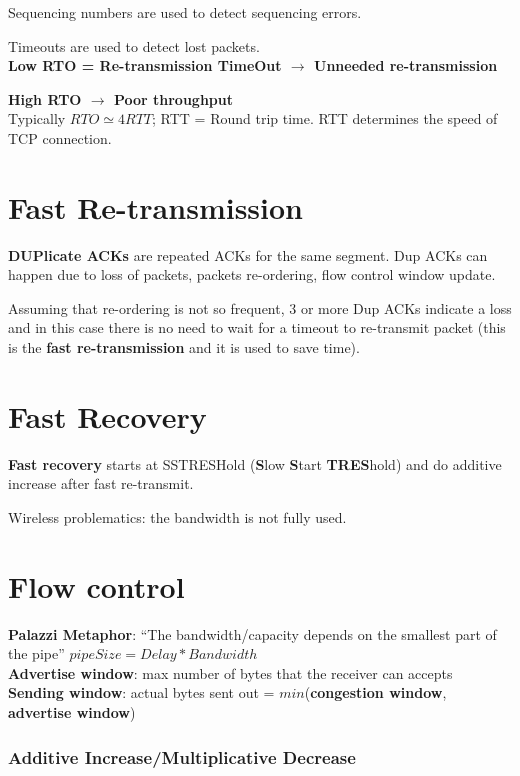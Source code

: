 Sequencing numbers are used to detect sequencing errors.

Timeouts are used to detect lost packets. \\

\textbf{Low RTO = Re-transmission TimeOut $\rightarrow$ Unneeded re-transmission}

\textbf{High RTO $\rightarrow$ Poor throughput} \\

Typically $RTO \simeq 4 RTT$; RTT = Round trip time. RTT determines the speed
of TCP connection.

\section{Fast Re-transmission}

\textbf{DUPlicate ACKs} are repeated ACKs for the same segment. Dup ACKs can
happen due to loss of packets, packets re-ordering, flow control window update.

Assuming that re-ordering is not so frequent, 3 or more Dup ACKs indicate a
loss and in this case there is no need to wait for a timeout to re-transmit
packet (this is the \textbf{fast re-transmission} and it is used to save time).

\section{Fast Recovery}

\textbf{Fast recovery} starts at SSTRESHold (\textbf{S}low \textbf{S}tart
\textbf{TRES}hold) and do additive increase after fast re-transmit.

Wireless problematics: the bandwidth is not fully used.

\section{Flow control}

\textbf{Palazzi Metaphor}: ``The bandwidth/capacity depends on the smallest
part of the pipe'' $pipeSize = Delay * Bandwidth$ \\

\textbf{Advertise window}: max number of bytes that the receiver can accepts \\

\textbf{Sending window}: actual bytes sent out = $min$(\textbf{congestion
window}, \textbf{advertise window})

\subsubsection{Additive Increase/Multiplicative Decrease}

